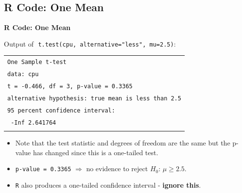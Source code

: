 \documentclass[compress]{beamer}        %
\makeatletter
\newcommand{\tcb}{\textcolor{beamer@blendedblue}}
\makeatother
\begin{document}
\subsection{R Code: One Mean}
\begin{frame}{\bf \tcb{R Code: One Mean}}

Output of\,\, \texttt{t.test(cpu, alternative="less", mu=2.5)}:\\[0.3cm]

\begin{footnotesize}
\begin{tabular}{|l|}
\hline
\texttt{One Sample t-test}\\[0.2cm]
\texttt{data:  cpu}\\
\texttt{t = -0.466, df = 3, p-value = 0.3365}\\
\texttt{alternative hypothesis: true mean is less than 2.5}\\
\texttt{95 percent confidence interval:}\\
\texttt{ -Inf 2.641764}\\
\hline
\multicolumn{1}{c}{}\\[0.0cm]
\end{tabular}
\end{footnotesize}
\begin{itemize}\itemsep0.3cm
\item Note that the test statistic and degrees of freedom are the same but the p-value has changed since this is a one-tailed test.
\item \texttt{p-value = 0.3365} $\Rightarrow$ no evidence to reject $H_0: \, \mu \ge 2.5$.
\item \texttt{R} also produces a one-tailed confidence interval - {\bf ignore this}.
\end{itemize}

\end{frame}
\end{document}
